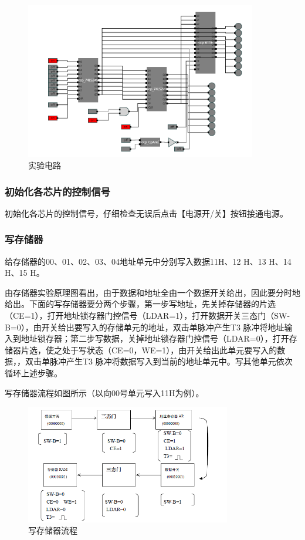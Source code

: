 \documentclass[UTF8,12pt]{article}
\begin{document}
\begin{figure}[htbp]
    \centering
    \includegraphics[width=0.9\textwidth]{img/19.png}
    \caption{实验电路}
\end{figure}

\subsubsection{初始化各芯片的控制信号}
初始化各芯片的控制信号，仔细检查无误后点击【电源开/关】按钮接通电源。

\subsubsection{写存储器}
给存储器的00、01、02、03、04地址单元中分别写入数据11H、12 H、13 H、14 H、15 H。

由存储器实验原理图看出，由于数据和地址全由一个数据开关给出，因此要分时地给出。下面的写存储器要分两个步骤，第一步写地址，先关掉存储器的片选（CE=1），打开地址锁存器门控信号（LDAR=1），打开数据开关三态门（SW-B=0），由开关给出要写入的存储单元的地址，双击单脉冲产生T3 脉冲将地址输入到地址锁存器；第二步写数据，关掉地址锁存器门控信号（LDAR=0），打开存储器片选，使之处于写状态（CE=0，WE=1），由开关给出此单元要写入的数据，，双击单脉冲产生T3 脉冲将数据写入到当前的地址单元中。写其他单元依次循环上述步骤。

写存储器流程如图所示（以向00号单元写入11H为例）。

\begin{figure}[htbp]
    \centering
    \includegraphics[width=0.8\textwidth]{img/17.png}
    \caption{写存储器流程}
\end{figure}
\end{document}

